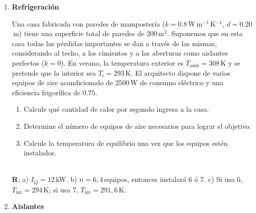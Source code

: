 \documentclass[a4paper,12pt]{article}
\begin{document}
\begin{enumerate}
	\item{\bf{Refrigeración}}
		
		Una casa fabricada con paredes de mampostería
		($k=0.8$\,W\,m$^{-1}$\,K$^{-1}$, $d=0.20$\,m) tiene una superficie
		total de paredes de $200$\,m$^2$. Suponemos que en esta casa todas las
		pérdidas importantes se dan a través de las mismas, considerando al
		techo, a los cimientos y a las aberturas como aislantes perfectos
		($k=0$).  En verano, la temperatura exterior es
		$T_{\mathrm{amb}}=308$\,K y se pretende que la interior sea
		$T_{i}=293$\,K. El arquitecto dispone de varios equipos de aire
		acondicionado de $2500$\,W de consumo eléctrico y una eficiencia
		frigorífica de $0.75$.
		\begin{enumerate}
			\item Calcule qué cantidad de calor por segundo ingresa a la casa.
			\item Determine el número de equipos de aire necesarios para lograr
				el objetivo.
			\item Calcule la temperatura de equilibrio una vez que los equipos
				estén instalados.
		\end{enumerate}
		\\{\bf{R}}: a) $I_Q=12$\,kW. b) $n=6,4$\,equipos, entonces instalará 6
		ó 7. c) Si usa 6, $T_{\mathrm{int}}=294$\,K; si usa 7,
		$T_{\mathrm{int}}=291,6$\,K. 
	
	\item{\bf{Aislantes}}
		

\end{enumerate}
\end{document}
